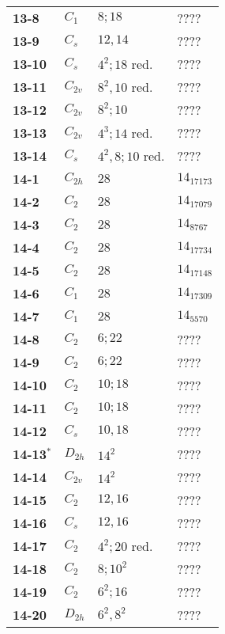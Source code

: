 \documentclass[12pt]{article}
\begin{document}
\begin{table}
\begin{center}
{\begin{minipage}[t]{7cm}
\begin{tabular}{||l|l|l|l||}
{\bf 13-8}      &$C_1$  &$8; 18$                &????\\
{\bf 13-9}      &$C_s$  &$12, 14$               &????\\
{\bf 13-10}     &$C_s$  &$4^2; 18$ red. &????\\
{\bf 13-11}     &$C_{2v}$       &$8^2, 10$ red. &????\\
{\bf 13-12}     &$C_{2v}$       &$8^2; 10$      &????\\
{\bf 13-13}     &$C_{2v}$       &$4^3; 14$ red. &????\\
{\bf 13-14}     &$C_s$  &$4^2,8;10$ red.        &????\\\hline
{\bf 14-1}      &$C_{2h}$       &$28$           &$14_{17173}$\\
{\bf 14-2}      &$C_{2}$        &$28$           &$14_{17079}$\\
{\bf 14-3}      &$C_2$  &$28$           &$14_{8767}$\\
{\bf 14-4}      &$C_2$  &$28$           &$14_{17734}$\\
{\bf 14-5}      &$C_2$  &$28$           &$14_{17148}$\\
{\bf 14-6}      &$C_1$  &$28$           &$14_{17309}$\\
{\bf 14-7}      &$C_1$  &$28$           &$14_{5570}$\\
{\bf 14-8}      &$C_{2}$        &$6; 22$                &????\\
{\bf 14-9}      &$C_2$  &$6; 22$                &????\\
{\bf 14-10}     &$C_2$  &$10; 18$               &????\\
{\bf 14-11}     &$C_2$  &$10; 18$               &????\\
{\bf 14-12}     &$C_s$  &$10, 18$               &????\\
{\bf 14-13${}^{*}$}     &$D_{2h}$       &$14^2$         &????\\
{\bf 14-14}     &$C_{2v}$       &$14^2$         &????\\
{\bf 14-15}     &$C_2$  &$12, 16$               &????\\
{\bf 14-16}     &$C_{s}$        &$12, 16$               &????\\
{\bf 14-17}     &$C_2$  &$4^2; 20$ red. &????\\
{\bf 14-18}     &$C_2$  &$8; 10^2$      &????\\
{\bf 14-19}     &$C_2$  &$6^2; 16$      &????\\
{\bf 14-20}     &$D_{2h}$       &$6^2, 8^2$     &????\\

\end{tabular}
\end{minipage}}
\end{center}
\end{table}
\end{document}
